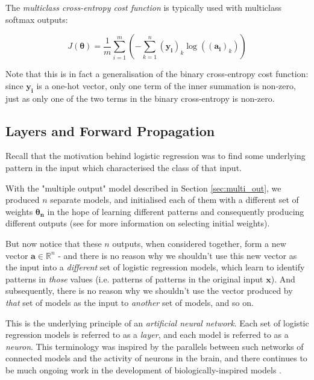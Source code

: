 \documentclass{article}[11pt]
\begin{document}
        The \textit{multiclass cross-entropy cost function} is typically used with multiclass softmax outputs:
        
        $$
        J(\boldsymbol{\theta}) = \frac{1}{m} \sum_{i=1}^{m} \left( - \sum_{k=1}^{n} (\mathbf{y_i})_k \log(\mathbf{(a_i)}_k) \right)
        $$
        
        Note that this is in fact a generalisation of the binary cross-entropy cost function: since $\mathbf{y_i}$ is a one-hot vector, only one term of the inner summation is non-zero, just as only one of the two terms in the binary cross-entropy is non-zero.
        
        
        
    
    \subsection{Layers and Forward Propagation}
        
        
        Recall that the motivation behind logistic regression was to find some underlying pattern in the input which characterised the class of that input.
        
        With the "multiple output" model described in Section \ref{sec:multi_out}, we produced $n$ separate models, and initialised each of them with a different set of weights $\boldsymbol{\theta_n}$ in the hope of learning different patterns and consequently producing different outputs (see \cite{lecun_backprop} for more information on selecting initial weights).
        
        But now notice that these $n$ outputs, when considered together, form a new vector $\mathbf{a} \in \mathbb{R}^n$ - and there is no reason why we shouldn't use this new vector as the input into a \textit{different} set of logistic regression models, which learn to identify patterns in \textit{those} values (i.e. patterns of patterns in the original input $\mathbf{x}$). And subsequently, there is no reason why we shouldn't use the vector produced by \textit{that} set of models as the input to \textit{another} set of models, and so on.
        
        This is the underlying principle of an \textit{artificial neural network}. Each set of logistic regression models is referred to as a \textit{layer}, and each model is referred to as a \textit{neuron}. This terminology was inspired by the parallels between such networks of connected models and the activity of neurons in the brain, and there continues to be much ongoing work in the development of biologically-inspired models \cite{bionets}.
        
\end{document}
